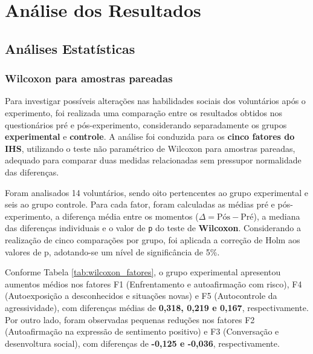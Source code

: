 \chapter{Análise dos Resultados}
  \section{Análises Estatísticas}
    \subsection{Wilcoxon para amostras pareadas}
      Para investigar possíveis alterações nas habilidades sociais dos voluntários após o experimento, foi realizada uma comparação entre os resultados obtidos nos questionários pré e pós-experimento, considerando separadamente os grupos \textbf{experimental} e \textbf{controle}. A análise foi conduzida para os \textbf{cinco fatores do IHS}, utilizando o teste não paramétrico de Wilcoxon\cite{Wilcoxon1945} para amostras pareadas, adequado para comparar duas medidas relacionadas sem pressupor normalidade das diferenças.

      Foram analisados 14 voluntários, sendo oito pertencentes ao grupo experimental e seis ao grupo controle. Para cada fator, foram calculadas as médias pré e pós-experimento, a diferença média entre os momentos ($\Delta = \text{Pós} - \text{Pré}$), a mediana das diferenças individuais e o valor de \texttt{p} do teste de \textbf{Wilcoxon}. Considerando a realização de cinco comparações por grupo, foi aplicada a correção de Holm aos valores de p, adotando-se um nível de significância de 5\%.

      Conforme Tabela \ref{tab:wilcoxon_fatores}, o grupo experimental apresentou aumentos médios nos fatores F1 (Enfrentamento e autoafirmação com risco), F4 (Autoexposição a desconhecidos e situações novas) e F5 (Autocontrole da agressividade), com diferenças médias de \textbf{0,318, 0,219 e 0,167}, respectivamente. Por outro lado, foram observadas pequenas reduções nos fatores F2 (Autoafirmação na expressão de sentimento positivo) e F3 (Conversação e desenvoltura social), com diferenças de \textbf{-0,125 e -0,036}, respectivamente.

